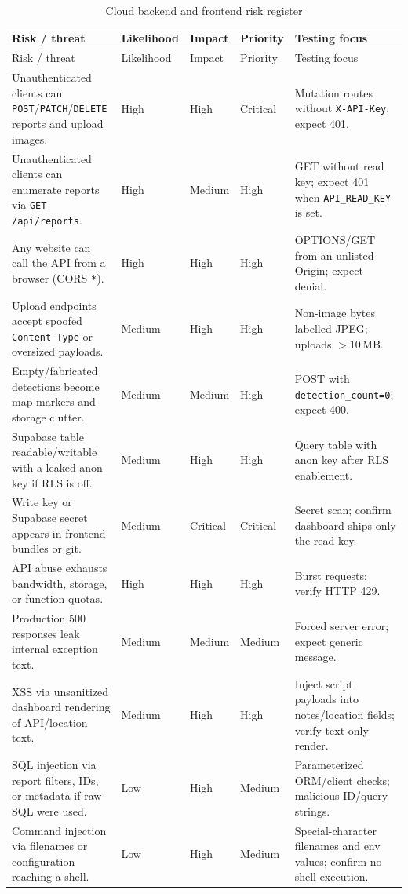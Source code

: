 \documentclass[12pt]{article}
\newcommand{\toprule}{\hline}
\newcommand{\midrule}{\hline}
\newcommand{\bottomrule}{\hline}
\begin{document}
\begin{longtable}{p{}p{}p{}p{}p{}}
\caption{Cloud backend and frontend risk register}\label{tab:cloud-risks}\\
\toprule
Risk / threat & Likelihood & Impact & Priority & Testing focus \\
\midrule
\endfirsthead
\toprule
Risk / threat & Likelihood & Impact & Priority & Testing focus \\
\midrule
\endhead
Unauthenticated clients can \texttt{POST}/\texttt{PATCH}/\texttt{DELETE} reports and upload images. & High & High & Critical & Mutation routes without \texttt{X-API-Key}; expect 401. \\
Unauthenticated clients can enumerate reports via \texttt{GET /api/reports}. & High & Medium & High & GET without read key; expect 401 when \texttt{API\_READ\_KEY} is set. \\
Any website can call the API from a browser (CORS \texttt{*}). & High & High & High & OPTIONS/GET from an unlisted Origin; expect denial. \\
Upload endpoints accept spoofed \texttt{Content-Type} or oversized payloads. & Medium & High & High & Non-image bytes labelled JPEG; uploads $>$10\,MB. \\
Empty/fabricated detections become map markers and storage clutter. & Medium & Medium & High & POST with \texttt{detection\_count=0}; expect 400. \\
Supabase table readable/writable with a leaked anon key if RLS is off. & Medium & High & High & Query table with anon key after RLS enablement. \\
Write key or Supabase secret appears in frontend bundles or git. & Medium & Critical & Critical & Secret scan; confirm dashboard ships only the read key. \\
API abuse exhausts bandwidth, storage, or function quotas. & High & High & High & Burst requests; verify HTTP 429. \\
Production 500 responses leak internal exception text. & Medium & Medium & Medium & Forced server error; expect generic message. \\
XSS via unsanitized dashboard rendering of API/location text. & Medium & High & High & Inject script payloads into notes/location fields; verify text-only render. \\
SQL injection via report filters, IDs, or metadata if raw SQL were used. & Low & High & Medium & Parameterized ORM/client checks; malicious ID/query strings. \\
Command injection via filenames or configuration reaching a shell. & Low & High & Medium & Special-character filenames and env values; confirm no shell execution. \\
\bottomrule
\end{longtable}
\end{document}
